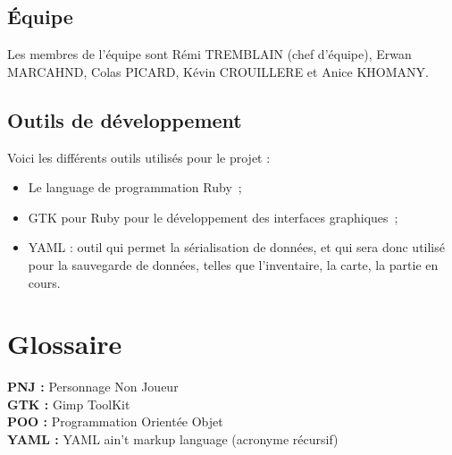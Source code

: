 \documentclass[11pt]{article}
\begin{document}
\subsection{Équipe}

Les membres de l'équipe sont Rémi TREMBLAIN (chef d'équipe), Erwan MARCAHND, Colas PICARD, Kévin CROUILLERE et Anice KHOMANY.





\subsection{Outils de développement}

Voici les différents outils utilisés pour le projet :

\begin{itemize}
   \item Le language de programmation Ruby~;
   \item GTK pour Ruby pour le développement des interfaces graphiques~;
   \item YAML : outil qui permet la sérialisation de données, et qui sera donc utilisé pour la sauvegarde de données, telles que l'inventaire, la carte, la partie en cours.
\end{itemize}



\section{Glossaire}

\textbf{PNJ : }Personnage Non Joueur\\
\textbf{GTK : }Gimp ToolKit\\
\textbf{POO : }Programmation Orientée Objet\\
\textbf{YAML : }YAML ain't markup language (acronyme récursif)\\


\renewcommand{\thefootnote}{\*} %
\end{document}
